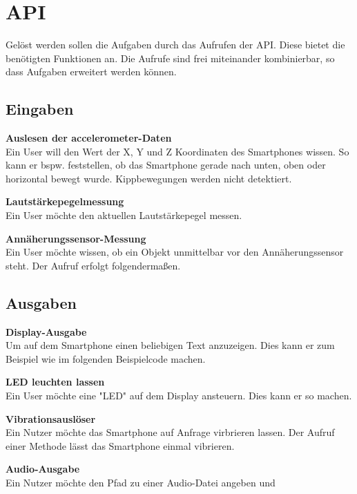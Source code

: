 \documentclass[11pt,a4paper]{report}
\begin{document}
\section*{API}
Gelöst werden sollen die Aufgaben durch das Aufrufen der API.
Diese bietet die benötigten Funktionen an.
Die Aufrufe sind frei miteinander kombinierbar, so dass Aufgaben erweitert werden können.

\subsection*{Eingaben}

\textbf{Auslesen der accelerometer-Daten}\\
Ein User will den Wert der X, Y und Z Koordinaten des Smartphones wissen.
So kann er bspw. feststellen, ob das Smartphone gerade nach unten, oben oder horizontal bewegt wurde.
Kippbewegungen werden nicht detektiert.


\textbf{Lautstärkepegelmessung}\\
Ein User möchte den aktuellen Lautstärkepegel messen.


\textbf{Annäherungssensor-Messung}\\
Ein User möchte wissen, ob ein Objekt unmittelbar vor den Annäherungssensor steht.
Der Aufruf erfolgt folgendermaßen.


\subsection*{Ausgaben}

\textbf{Display-Ausgabe}\\
Um auf dem Smartphone einen beliebigen Text anzuzeigen.
Dies kann er zum Beispiel wie im folgenden Beispielcode machen.


\textbf{LED leuchten lassen}\\
Ein User möchte eine "LED" auf dem Display ansteuern.
Dies kann er so machen.


\textbf{Vibrationsauslöser}\\
Ein Nutzer möchte das Smartphone auf Anfrage virbrieren lassen.
Der Aufruf einer Methode lässt das Smartphone einmal vibrieren.


\textbf{Audio-Ausgabe}\\
Ein Nutzer möchte den Pfad zu einer Audio-Datei angeben und

\end{document}
